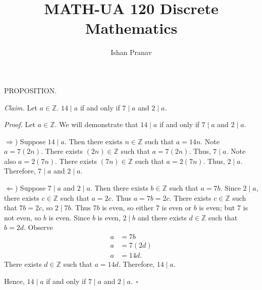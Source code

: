 \documentclass[9pt]{article}
\title{MATH-UA 120 Discrete Mathematics}
\author{Ishan Pranav}
\date{}
\begin{document}
\maketitle
\noindent\small{PROPOSITION.}\newline

\noindent\textit{Claim. }Let $a\in \mathbb{Z}$. $14\mid a$ if and only if $7\mid a$ and $2\mid a$.
\newline

\noindent\textit{Proof. }Let $a\in\mathbb{Z}$. We will demonstrate that $14\mid a$ if and only if $7\mid a$ and $2\mid a$.
\newline

\noindent$\Rightarrow$) Suppose $14\mid a$. Then there exists $n\in\mathbb{Z}$ such that $a=14n$. Note $a=7(2n)$. There exists $(2n)\in\mathbb{Z}$ such that $a=7(2n)$. Thus, $7\mid a$. Note also $a=2(7n)$. There exists $(7n)\in\mathbb{Z}$ such that $a=2(7n)$. Thus, $2\mid a$. Therefore, $7\mid a$ and $2\mid a$. 
\newline

\noindent$\Leftarrow$) Suppose $7\mid a$ and $2\mid a$. Then there exists $b\in\mathbb{Z}$ such that $a=7b$. Since $2\mid a$, there exists $c\in\mathbb{Z}$ such that $a=2c$. Thus $a=7b=2c$. There exists $c\in\mathbb{Z}$ such that $7b=2c$, so $2\mid 7b$. Thus $7b$ is even, so either 7 is even or $b$ is even; but 7 is not even, so $b$ is even. Since $b$ is even, $2\mid b$ and there exists $d\in\mathbb{Z}$ such that $b=2d$. Observe
\begin{align*}
a&=7b\\
a&=7(2d)\\
a&=14d.
\end{align*}
There exists $d\in\mathbb{Z}$ such that $a=14d$. Therefore, $14\mid a$.
\newline

\noindent Hence, $14\mid a$ if and only if $7\mid a$ and $2\mid a.~~\square$
\end{document}

